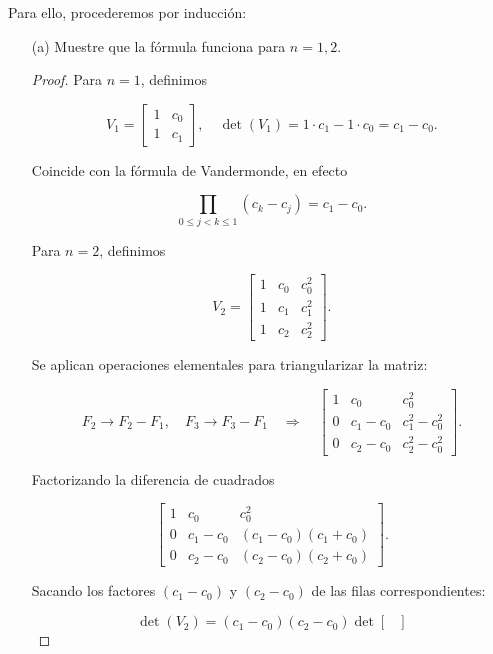 \documentclass[11pt]{article}
\theoremstyle{definition} %
\begin{document}
Para ello, procederemos por inducción:
\begin{enumerate}
  \item[(a)] Muestre que la fórmula funciona para \(n=1,2\).
  \begin{proof}
    Para \(n=1\), definimos

\[
V_1 = \begin{bmatrix} 1 & c_0 \\ 1 & c_1 \end{bmatrix}, \quad
\det(V_1) = 1 \cdot c_1 - 1 \cdot c_0 = c_1 - c_0.
\]

Coincide con la fórmula de Vandermonde, en efecto

\[
\prod_{0 \le j < k \le 1} (c_k - c_j) = c_1 - c_0.
\]

Para \(n=2\), definimos

\[
V_2 = \begin{bmatrix} 1 & c_0 & c_0^2 \\ 1 & c_1 & c_1^2 \\ 1 & c_2 & c_2^2 \end{bmatrix}.
\]

Se aplican operaciones elementales para triangularizar la matriz:

\[
F_2 \to F_2 - F_1, \quad F_3 \to F_3 - F_1 \quad \Rightarrow \quad
\begin{bmatrix}

1 & c_0 & c_0^2 \\

0 & c_1 - c_0 & c_1^2 - c_0^2 \\

0 & c_2 - c_0 & c_2^2 - c_0^2

\end{bmatrix}.
\]

Factorizando la diferencia de cuadrados

\[
\begin{bmatrix}

1 & c_0 & c_0^2 \\

0 & c_1 - c_0 & (c_1 - c_0)(c_1 + c_0) \\

0 & c_2 - c_0 & (c_2 - c_0)(c_2 + c_0)

\end{bmatrix}.
\]

Sacando los factores \((c_1 - c_0)\) y \((c_2 - c_0)\) de las filas correspondientes:

\[
\det(V_2) = (c_1 - c_0)(c_2 - c_0)
\det \begin{bmatrix}


\end{bmatrix}\]
\end{proof}
\end{enumerate}
\end{document}
